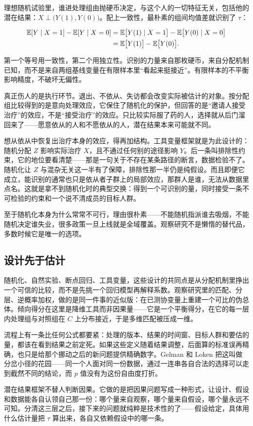 理想随机试验里，谁进处理组由抛硬币决定，与这个人的一切特征无关，包括他的潜在结果：\(X\perp\bigl(Y(1),Y(0)\bigr)\)。配上一致性，最朴素的组间均值差就识别了 \(\tau\)：

\[
\begin{aligned}
\mathbb{E}[Y\mid X=1]-\mathbb{E}[Y\mid X=0]
&=\mathbb{E}\bigl[Y(1)\mid X=1\bigr]-\mathbb{E}\bigl[Y(0)\mid X=0\bigr]\\
&=\mathbb{E}\bigl[Y(1)\bigr]-\mathbb{E}\bigl[Y(0)\bigr].
\end{aligned}
\]

第一个等号用一致性，第二个用独立性。识别的力量来自那枚硬币，来自分配机制已知，而不是来自两组基线变量在有限样本里``看起来挺接近''。有限样本的不平衡影响精度，不破坏无偏性。

真正伤人的是执行环节。退出、不依从、失访都会改变实际被估计的对象。按分配组比较得到的是意向处理效应，它保住了随机化的保护，但回答的是``邀请人接受治疗''的效应，不是``接受治疗''的效应。只比较实际服了药的人，选择就从后门溜回来了——愿意依从的人和不愿依从的人，潜在结果本来可能就不同。

想从依从中恢复出治疗本身的效应，得再加结构。工具变量框架就是为此设计的：随机分配 \(Z\) 影响实际治疗 \(X\)，且不通过任何别的途径影响 \(Y\)。后一条叫排除性约束，它的地位要看清楚——那是一句关于不存在某条路径的断言，数据检验不了。随机化让 \(Z\) 与混杂无关这一半有了保障，排除性那一半仍是纯假设。而且即便它成立，能识别的通常也只是依从者子群上的局部效应，那群人是谁，无法从数据里点名。这就是拿不到随机化时的典型交换：得到一个可识别的量，同时接受一条不可检验的约束和一个说不清成员的目标人群。

至于随机化本身为什么常常不可行，理由很朴素——不能随机指派谁去吸烟，不能随机决定谁失业，很多政策一旦上线就是全域覆盖。观察研究不是懒惰的替代品，多数时候它是唯一的选项。

\subsection{设计先于估计}

随机化、自然实验、断点回归、工具变量，这些设计的共同点是从分配机制里挣出一个可信的比较，而不是先挑一个回归模型再解释系数。观察研究里的匹配、分层、逆概率加权，做的是同一件事的近似版：在已测协变量上重建一个可比的伪总体。倾向得分在这里是降维工具而非因果量——它是一个平衡得分，在它的每一层内处理组与对照组在 \(C\) 上分布接近，于是多维匹配被压成一维。

流程上有一条比任何公式都要紧：处理的版本、结果的时间窗、目标人群和要估的量，都该在看到结果之前定死。如果这些定义随着结果调整，后面算的标准误再精确，也只是给那个挪动之后的新问题提供精确数字。Gelman 和 Loken 把这叫做分岔小径的花园——同一个人面对同一份数据，通过一连串各自合法的选择可以走到截然不同的结论，而 \(p\) 值没有为这份自由度打折。

潜在结果框架不替人判断因果。它做的是把因果问题写成一种形式，让设计、假设和数据能各自认领自己那一份：哪个量来自观察，哪个量来自假设，哪个量永远不可知。分清这三层之后，接下来的问题就纯粹是技术性的了——假设给定，具体用什么估计量把 \(\tau\) 算出来，各自又依赖假设中的哪一条。
